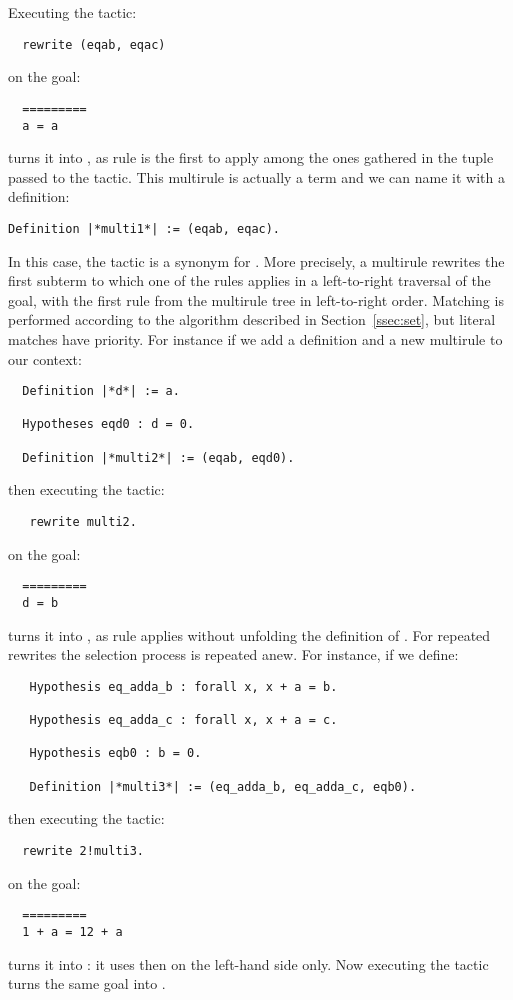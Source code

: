 Executing the tactic:
\begin{lstlisting}
  rewrite (eqab, eqac)
\end{lstlisting}
on the goal:
\begin{lstlisting}
  =========
  a = a
\end{lstlisting}
turns it into , as rule  is the first to apply among
the ones gathered in the tuple passed to the 
tactic. This multirule  is actually a \Coq{} term and we
can name it with a definition:
\begin{lstlisting}
Definition |*multi1*| := (eqab, eqac).
\end{lstlisting}
In this case, the tactic  is a synonym for
. More precisely, a multirule rewrites
the first subterm to which one of the rules applies in a left-to-right
traversal of the goal, with the first rule from the multirule tree in
left-to-right order. Matching is performed according to the algorithm
described in Section~\ref{ssec:set}, but literal matches have
priority. For instance if we add a definition and a new multirule to
our context:

\begin{lstlisting}
  Definition |*d*| := a.

  Hypotheses eqd0 : d = 0.

  Definition |*multi2*| := (eqab, eqd0).
\end{lstlisting}
then executing the tactic:
\begin{lstlisting}
   rewrite multi2.
\end{lstlisting}
on the goal:
\begin{lstlisting}
  =========
  d = b
\end{lstlisting}
turns it into , as rule  applies without unfolding
the definition of .  For repeated rewrites the selection process
is repeated anew. For instance, if we define:

\begin{lstlisting}
   Hypothesis eq_adda_b : forall x, x + a = b.

   Hypothesis eq_adda_c : forall x, x + a = c.

   Hypothesis eqb0 : b = 0.

   Definition |*multi3*| := (eq_adda_b, eq_adda_c, eqb0).
\end{lstlisting}
then executing the tactic:
\begin{lstlisting}
  rewrite 2!multi3.
\end{lstlisting}
on the goal:
\begin{lstlisting}
  =========
  1 + a = 12 + a
\end{lstlisting}
turns it into : it uses  then  on the
left-hand side only. Now executing the tactic 
turns the same goal into .

